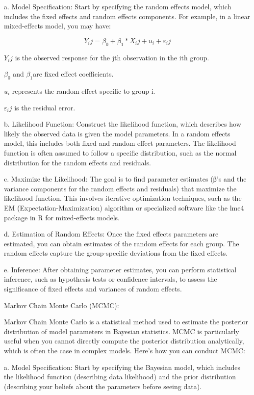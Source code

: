 \documentclass[UTF8,a4paper,10pt]{article}
\begin{document}
{{{a. Model Specification: Start by specifying the random effects model, which includes the fixed effects and random effects components. For example, in a linear mixed-effects model, you may have:

\[Y_ij = β_0 + β_1*X_ij + u_i + ε_ij\]


\(Y_ij\) is the observed response for the jth observation in the ith group.

\(β_0\) and \(β_1 \)are fixed effect coefficients.

\(u_i\) represents the random effect specific to group i.

\(ε_ij\) is the residual error.


b. Likelihood Function: Construct the likelihood function, which describes how likely the observed data is given the model parameters. In a random effects model, this includes both fixed and random effect parameters. The likelihood function is often assumed to follow a specific distribution, such as the normal distribution for the random effects and residuals.

c. Maximize the Likelihood: The goal is to find parameter estimates (β's and the variance components for the random effects and residuals) that maximize the likelihood function. This involves iterative optimization techniques, such as the EM (Expectation-Maximization) algorithm or specialized software like the lme4 package in R for mixed-effects models.

d. Estimation of Random Effects: Once the fixed effects parameters are estimated, you can obtain estimates of the random effects for each group. The random effects capture the group-specific deviations from the fixed effects.

e. Inference: After obtaining parameter estimates, you can perform statistical inference, such as hypothesis tests or confidence intervals, to assess the significance of fixed effects and variances of random effects.

Markov Chain Monte Carlo (MCMC):

Markov Chain Monte Carlo is a statistical method used to estimate the posterior distribution of model parameters in Bayesian statistics. MCMC is particularly useful when you cannot directly compute the posterior distribution analytically, which is often the case in complex models. Here's how you can conduct MCMC:

a. Model Specification: Start by specifying the Bayesian model, which includes the likelihood function (describing data likelihood) and the prior distribution (describing your beliefs about the parameters before seeing data).

}}}
\end{document}
